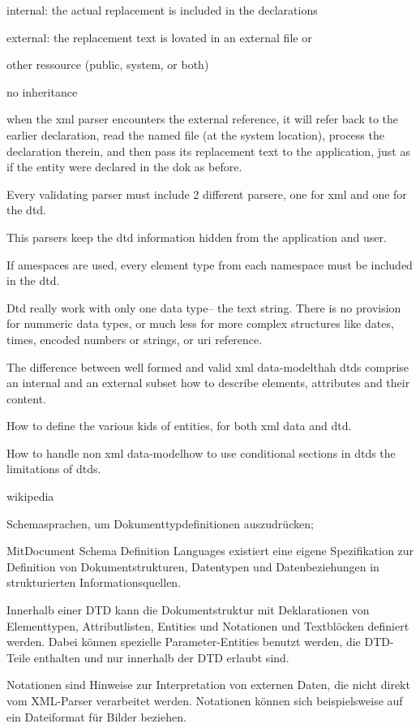 internal: the actual replacement is included in the declarations

external: the replacement text is lovated in an external file or

other ressource (public, system, or both)

no inheritance

when the xml parser encounters the external reference, it will refer back to the earlier declaration, read the named file (at the system location), process the declaration therein, and then pass its replacement text to the application, just as if the entity were declared in the dok as before.

Every validating parser must include 2 different parsere, one for xml and one for the dtd.

This parsers keep the dtd information hidden from the application and user.

If amespaces are used, every element type from each namespace must be included in the dtd.

Dtd really work with only one data type-- the text string. There is no provision for nummeric data types, or much less for more complex structures like dates, times, encoded numbers or strings, or uri reference.

The difference between well formed and valid xml data-modelthah dtds comprise an internal and an external subset how to describe elements, attributes and their content.

How to define the various kids of entities, for both xml data and dtd.

How to handle non xml data-modelhow to use conditional sections in dtds the limitations of dtds.


wikipedia

Schemasprachen, um Dokumenttypdefinitionen auszudrücken;

MitDocument Schema Definition Languages existiert eine eigene Spezifikation zur Definition von Dokumentstrukturen, Datentypen und Datenbeziehungen in strukturierten Informationsquellen.

Innerhalb einer DTD kann die Dokumentstruktur mit Deklarationen von Elementtypen, Attributlisten, Entities und Notationen und Textblöcken definiert werden. Dabei können spezielle Parameter-Entities benutzt werden, die DTD-Teile enthalten und nur innerhalb der DTD erlaubt sind.

Notationen sind Hinweise zur Interpretation von externen Daten, die nicht direkt vom XML-Parser verarbeitet werden. Notationen können sich beispielsweise auf ein Dateiformat für Bilder beziehen.

